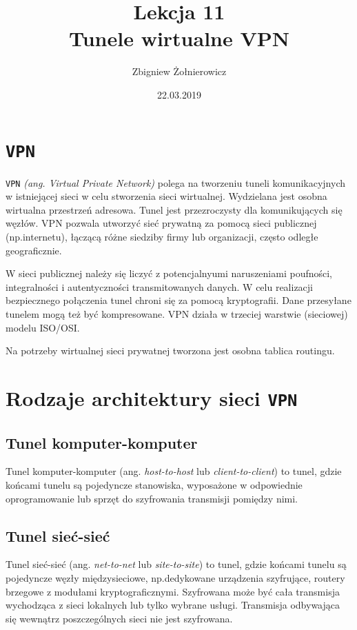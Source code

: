 \documentclass{article}
\begin{document}
\title{
{\huge Lekcja 11} \\
{\large Tunele wirtualne VPN}
}
\author{Zbigniew Żołnierowicz}
\date{22.03.2019}
\maketitle
\section{\tt VPN}
{\tt VPN} \emph{(ang. Virtual Private Network)} polega na tworzeniu tuneli komunikacyjnych
w istniejącej sieci w celu stworzenia sieci wirtualnej. 
Wydzielana jest osobna wirtualna przestrzeń adresowa.
Tunel jest przezroczysty dla komunikujących się węzłów.
VPN pozwala utworzyć sieć prywatną za pomocą sieci publicznej (np.\@ internetu),
łączącą różne siedziby firmy lub organizacji, często odległe geograficznie.

W sieci publicznej należy się liczyć z potencjalnyumi naruszeniami poufności,
integralności i autentyczności transmitowanych danych. W celu realizacji bezpiecznego połączenia
tunel chroni się za pomocą kryptografii.
Dane przesyłane tunelem mogą też być kompresowane.
VPN działa w trzeciej warstwie (sieciowej) modelu ISO/OSI.

Na potrzeby wirtualnej sieci prywatnej tworzona jest osobna tablica routingu.
\section{Rodzaje architektury sieci {\tt VPN}}
\subsection{Tunel komputer-komputer}
Tunel komputer-komputer (ang. \emph{host-to-host} lub \emph{client-to-client}) to tunel, gdzie
końcami tunelu są pojedyncze stanowiska, wyposażone w odpowiednie oprogramowanie lub sprzęt do
szyfrowania transmisji pomiędzy nimi.
\subsection{Tunel sieć-sieć}
Tunel sieć-sieć (ang. \emph{net-to-net} lub \emph{site-to-site}) to tunel, gdzie końcami tunelu
są pojedyncze węzły międzysieciowe, np.\@ dedykowane urządzenia szyfrujące, routery brzegowe
z modułami kryptograficznymi. Szyfrowana może być cała transmisja wychodząca z sieci lokalnych
lub tylko wybrane usługi. Transmisja odbywająca się wewnątrz poszczególnych sieci nie jest
szyfrowana.
\end{document}
